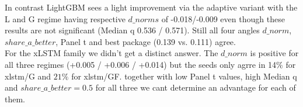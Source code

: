 In contrast LightGBM sees a light improvement via the adaptive variant with the L and G regime having respective $d\_norms$ of -0.018/-0.009 even though these results are not significant (Median q 0.536 / 0.571). Still all four angles $d\_norm$, $share\_a\_better$, Panel t and best package (0.139 vs. 0.111) agree.\\

For the xLSTM family we didn't get a distinct answer. The $d\_norm$ is positive for all three regimes (+0.005 / +0.006 / +0.014) but the seeds only agrre in 14$\%$ for xlstm/G and $21\%$ for xlstm/GF. together with low Panel t values, high Median q and $share\_a\_better=0.5$ for all three we cant determine an advantage for each of them.\\



%
%
